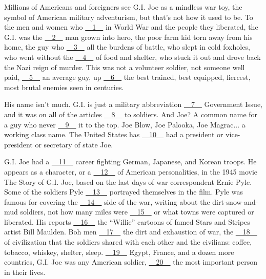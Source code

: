 Millions of Americans and foreigners see G.I. Joe as a mindless war toy, the symbol of American military adventurism, but that's not how it used to be. To the men and women who \uline{~~1~~} in World War \uppercase\expandafter{} and the people they liberated, the G.I. was the \uline{~~2~~} man grown into hero, the poor farm kid torn away from his home, the guy who \uline{~~3~~} all the burdens of battle, who slept in cold foxholes, who went without the \uline{~~4~~} of food and shelter, who stuck it out and drove back the Nazi reign of murder. This was not a volunteer soldier, not someone well paid, \uline{~~5~~} an average guy, up \uline{~~6~~} the best trained, best equipped, fiercest, most brutal enemies seen in centuries.


His name isn't much. G.I. is just a military abbreviation \uline{~~7~~} Government Issue, and it was on all of the articles \uline{~~8~~} to soldiers. And Joe? A common name for a guy who never \uline{~~9~~} it to the top. Joe Blow, Joe Palooka, Joe Magrac... a working class name. The United States has \uline{~~10~~} had a president or vice-president or secretary of state Joe.


G.I. Joe had a \uline{~~11~~} career fighting German, Japanese, and Korean troops. He appears as a character, or a \uline{~~12~~} of American personalities, in the 1945 movie The Story of G.I. Joe, based on the last days of war correspondent Ernie Pyle. Some of the soldiers Pyle \uline{~~13~~} portrayed themselves in the film. Pyle was famous for covering the \uline{~~14~~} side of the war, writing about the dirt-snow-and-mud soldiers, not how many miles were \uline{~~15~~} or what towns were captured or liberated. His reports \uline{~~16~~} the ``Willie'' cartoons of famed Stars and Stripes artist Bill Maulden. Boh men \uline{~~17~~} the dirt and exhaustion of war, the \uline{~~18~~} of civilization that the soldiers shared with each other and the civilians: coffee, tobacco, whiskey, shelter, sleep. \uline{~~19~~} Egypt, France, and a dozen more countries, G.I. Joe was any American soldier, \uline{~~20~~} the most important person in their lives.